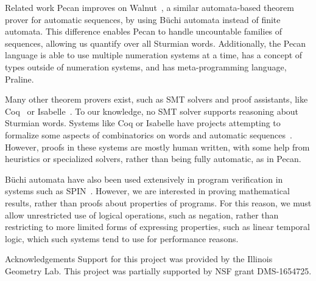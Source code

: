 
\begin{subsection}{Related work} 
Pecan improves on Walnut~\cite{walnut}, a similar automata-based theorem prover for automatic sequences, by using B\"uchi automata instead of finite automata.
This difference enables Pecan to handle uncountable families of sequences, allowing us quantify over all Sturmian words. Additionally, the Pecan language is able to use multiple numeration systems at a time, has a concept of types outside of numeration systems, and has meta-programming language, Praline.

Many other theorem provers exist, such as SMT solvers and proof assistants, like Coq~\cite{the_coq_development_team_2020_3744225} or Isabelle~\cite{nipkow2002isabelle}.
To our knowledge, no SMT solver supports reasoning about Sturmian words.
Systems like Coq or Isabelle have projects attempting to formalize some aspects of combinatorics on words and automatic sequences~\cite{hivert2018littlewoodrichardson,holub2020binary}.
However, proofs in these systems are mostly human written, with some help from heuristics or specialized solvers, rather than being fully automatic, as in Pecan.

B\"uchi automata have also been used extensively in program verification in systems such as SPIN~\cite{gerard2003spin}.
However, we are interested in proving mathematical results, rather than proofs about properties of programs.
For this reason, we must allow unrestricted use of logical operations, such as negation, rather than restricting to more limited forms of expressing properties, such as linear temporal logic, which such systems tend to use for performance reasons.

\end{subsection}

\begin{subsection}{Acknowledgements}
Support for this project was provided by the Illinois Geometry Lab. This project was partially supported by NSF grant DMS-1654725. \end{subsection}
